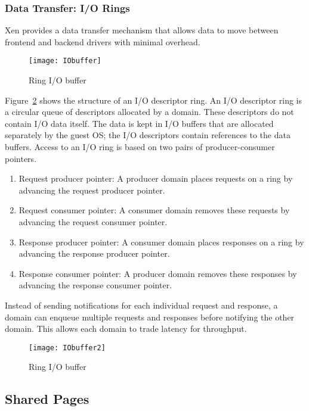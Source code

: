 \subsubsection*{Data Transfer: I/O Rings}
\label{subsec:io rings}
Xen provides a data transfer mechanism that allows data to move
between frontend and backend drivers with minimal overhead.

\begin{figure}[!ht]
\centering
\texttt{[image: IObuffer]}
\caption{Ring I/O buffer}
\label{fig:Ring buffer}
\end{figure}

Figure~\ref{fig:Ring buffer} shows the structure of an I/O descriptor
ring. An I/O descriptor ring is a circular queue of descriptors allocated
by a domain. These descriptors do not contain I/O data itself. The data is kept in I/O buffers
that are allocated separately by the guest OS; the I/O descriptors contain 
references to the data buffers.  Access to an I/O ring is based on two pairs
of producer-consumer pointers.

\begin{enumerate}
\item Request producer pointer: A producer domain places requests on a
ring by advancing the request producer pointer.

\item Request consumer pointer: A consumer domain removes these requests
by advancing the request consumer pointer.

\item Response producer pointer: A consumer domain places responses on
a ring by advancing the response producer pointer.

\item Response consumer pointer: A producer domain removes these responses
by advancing the response consumer pointer.

\end{enumerate} 

Instead of sending notifications for each individual request and response,
a domain can enqueue multiple requests and responses before notifying
the other domain. This allows each domain to trade latency for throughput.

\begin{figure}[!ht]
\centering
\texttt{[image: IObuffer2]}
\caption{Ring I/O buffer}
\label{fig:Ring buffer}
\end{figure}

\subsection*{Shared Pages}
\label{subsec:sharedpages}
